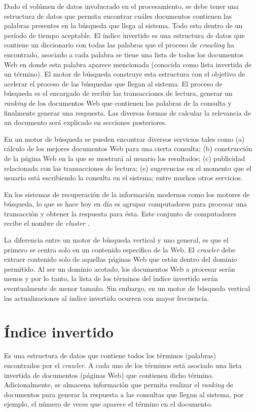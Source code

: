 Dado el volúmen de datos involucrado en el procesamiento, se debe tener una estructura de datos que permita encontrar cuáles documentos contienen las palabras presentes en la búsqueda que llega al sistema. Todo esto dentro de un período de tiempo aceptable. El índice invertido \citep{Zobel:2006} es una estructura de datos que contiene un diccionario con todas las palabras que el proceso de \textit{crawling} ha encontrado, asociado a cada palabra se tiene una lista de todos los documentos Web en donde esta palabra aparece mencionada (conocida como lista invertida de un término). El motor de búsqueda construye esta estructura con el objetivo de acelerar el proceso de las búsquedas que llegan al sistema. El proceso de búsqueda es el encargado de recibir las transacciones de lectura, generar un \textit{ranking} de los documentos Web que contienen las palabras de la consulta y finalmente generar una respuesta. Las diversas formas de calcular la relevancia de un documento será explicado en secciones posteriores.

En un motor de búsqueda se pueden encontrar diversos servicios tales como (a) cálculo de los mejores documentos Web para una cierta consulta; (b) construcción de la página Web en la que se mostrará al usuario los resultados; (c) publicidad relacionada con las transacciones de lectura; (e) sugerencias en el momento que el usuario está escribiendo la consulta en el sistema; entre muchos otros servicios.

En los sistemas de recuperación de la información modernos como los motores de búsqueda, lo que se hace hoy en día es agrupar computadores para procesar una transacción y obtener la respuesta para ésta. Este conjunto de computadores recibe el nombre de \textit{cluster} \citep{Dean:2009}.

La diferencia entre un motor de búsqueda vertical y uno general, es que el primero se centra solo en un contenido específico de la Web. El \textit{crawler} debe extraer contenido solo de aquellas páginas Web que están dentro del dominio permitido. Al ser un dominio acotado, los documentos Web a procesar serán menos y por lo tanto, la lista de los términos del índice invertido serán eventualmente de menor tamaño. Sin embargo, en un motor de búsqueda vertical las actualizaciones al índice invertido ocurren con mayor frecuencia.

\section{\'Indice invertido}
\label{marco:ii}
Es una estructura de datos que contiene todos los términos (palabras) encontrados por el \textit{crawler}. A cada uno de los términos está asociado una lista invertida de documentos (páginas Web) que contienen dicho término. Adicionalmente, se almacena información que permita realizar el \textit{ranking} de documentos para generar la respuesta a las consultas que llegan al sistema, por ejemplo, el número de veces que aparece el término en el documento.

